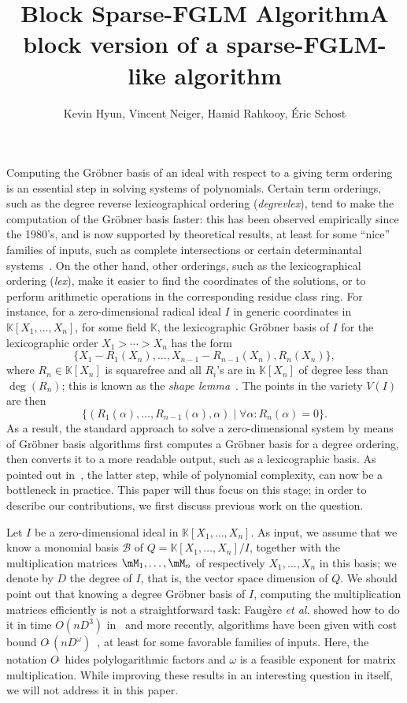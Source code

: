 \documentclass[12pt]{article}
\title{Block Sparse-FGLM Algorithm}
\title{A block version of a sparse-FGLM-like algorithm}
\author{Kevin Hyun, Vincent Neiger, Hamid Rahkooy, \'Eric Schost}
\newcommand{\basis}{\mathscr{B}}
\newcommand{\softO}[1]{O{\tilde{~}}(#1)} %
\def\K{\mathbb{K}}
\def\K {\ensuremath{\mathbb{K}}}
\begin{document}
\maketitle

Computing the Gr\"obner basis of an ideal with respect to a giving
term ordering is an essential step in solving systems of polynomials.
Certain term orderings, such as the degree reverse lexicographical
ordering (\textit{degrevlex}), tend to make the computation of the
Gr\"obner basis faster: this has been observed empirically since the
1980's, and is now supported by theoretical results, at least for some
``nice'' families of inputs, such as complete intersections or certain
determinantal systems~\cite{Faugere02,FaSaSp13,BaFaSa15}.  On the
other hand, other orderings, such as the lexicographical ordering
(\textit{lex}), make it easier to find the coordinates of the
solutions, or to perform arithmetic operations in the corresponding
residue class ring.  For instance, for a zero-dimensional radical
ideal $I$ in generic coordinates in $\K[X_1,\dots,X_n]$, for some field $\K$,
the lexicographic Gr\"obner basis of $I$ for the lexicographic order $X_1 > \cdots > X_n$
has the form
\begin{equation}\label{eq:shapelemma}
 \{ X_1 - R_1(X_n),\dots, X_{n-1}-R_{n-1}(X_n),R_n(X_n)\},
\end{equation}
where $R_n \in \K[X_n]$ is squarefree and all $R_i$'s are in $\K[X_n]$
of degree less than $\deg(R_n)$; this is known as the {\em shape
  lemma}~\cite{GiMo89}. The points in the variety $V(I)$ are then
$$\{ ( R_1(\alpha), \dots, R_{n-1}(\alpha), \alpha ) \mid \forall
 \alpha: R_n(\alpha)=0\}.$$ As a result, the standard approach to
 solve a zero-dimensional system by means of Gr\"obner basis
 algorithms first computes a Gr\"obner basis for a degree ordering,
 then converts it to a more readable output, such as a lexicographic
 basis. As pointed out in~\cite{FaMo17}, the latter step, while of
 polynomial complexity, can now be a bottleneck in practice. This
 paper will thus focus on this stage; in order to describe our 
 contributions, we first discuss previous work on the question.

 Let $I$ be a zero-dimensional ideal in $\K[X_1,\dots,X_n]$.  As
 input, we assume that we know a monomial basis $\basis$ of
 $Q=\K[X_1,\dots,X_n]/I$, together with the multiplication matrices
 $\mM_1,\dots,\mM_n$ of respectively $X_1,\dots,X_n$ in this basis; we
 denote by $D$ the degree of $I$, that is, the vector space dimension
 of $Q$. We should point out that knowing a degree Gr\"obner basis of
 $I$, computing the multiplication matrices efficiently is not a
 straightforward task: Faug\`ere {\it et al.} showed how to do it in
 time $O(nD^3)$ in~\cite{FaGiLaMo93} and more recently, algorithms have
 been given with cost bound
 $\softO{nD^\omega}$~\cite{FaGaHuRe13,FaGaHuRe14,Neiger16}, at
 least for some favorable families of inputs. Here, the notation
 $O\tilde{~}$ hides polylogarithmic factors and $\omega$ is a feasible
 exponent for matrix multiplication. While improving these results in
 an interesting question in itself, we will not address it in this
 paper.
\end{document}
